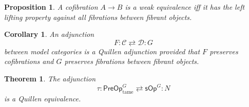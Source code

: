 \documentclass[a4paper,10pt
,draft
]{article}%
\numberwithin{equation}{section}
\numberwithin{figure}{section}
\newtheorem{theorem}[equation]{Theorem}%
\newtheorem{proposition}[equation]{Proposition}%
\newtheorem{corollary}[equation]{Corollary}%
\theoremstyle{definition} %
\newcommand{\1}{\ensuremath{\mathbbm 1}}%
\begin{document}
\begin{proposition}
	A cofibration $A \to B$ is a weak equivalence iff it has the left lifting property against all fibrations between fibrant objects.
\end{proposition}



\begin{corollary}\label{SIMPLQUILL COR}
	An adjunction 
\[
	F \colon \mathcal{C}
	\rightleftarrows
	\mathcal{D} \colon G
\]
	between model categories is a Quillen adjunction
	provided that $F$ preserves cofibrations
	and $G$ preserves fibrations between fibrant objects.
\end{corollary}



\begin{theorem}\label{PREQUIEQUIV THM}
	The adjunction
\begin{equation}\label{PREQUIEQUIV EQ}
	\tau \colon \mathsf{PreOp}^G_{\text{tame}}
	\rightleftarrows 
	\mathsf{sOp}^G \colon N
\end{equation}
	is a Quillen equivalence.
\end{theorem}
\end{document}
